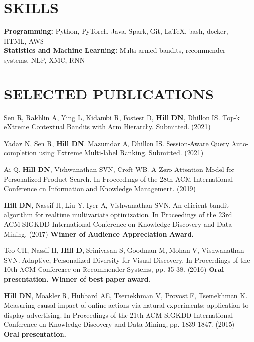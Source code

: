 \documentclass[line,10pt]{res}
\begin{document}
\begin{resume}
\section{SKILLS} 
{\bf Programming:} {\small Python, PyTorch, Java, Spark, Git, \LaTeX, bash, docker, HTML, AWS} \\
{\bf Statistics and Machine Learning: } {\small Multi-armed bandits, recommender systems, NLP, XMC, RNN}
    
\section{SELECTED PUBLICATIONS} 

Sen R, Rakhlin A, Ying L, Kidambi R, Fostesr D, \textbf{Hill DN}, Dhillon IS. Top-k eXtreme Contextual Bandits with Arm Hierarchy. Submitted. (2021)

Yadav N, Sen R, \textbf{Hill DN}, Mazumdar A, Dhillon IS. Session-Aware Query Auto-completion using Extreme Multi-label Ranking. Submitted. (2021)

Ai Q, \textbf{Hill DN}, Vishwanathan SVN, Croft WB. A Zero Attention Model for Personalized Product Search. In Proceedings of the 28th ACM International Conference on Information and Knowledge Management. (2019)

\textbf{Hill DN}, Nassif H, Liu Y, Iyer A, Vishwanathan SVN. An efficient bandit algorithm for realtime multivariate optimization. In Proceedings of the 23rd ACM SIGKDD International Conference on Knowledge Discovery and Data Mining. (2017) \textbf{Winner of Audience Appreciation Award.}

Teo CH, Nassif H, \textbf{Hill D}, Srinivasan S, Goodman M, Mohan V, Vishwanathan SVN. Adaptive, Personalized Diversity for Visual Discovery. In Proceedings of the 10th ACM Conference on Recommender Systems, pp. 35-38. (2016) \textbf{Oral presentation. Winner of best paper award.}

\textbf{Hill DN}, Moakler R, Hubbard AE, Tsemekhman V, Provost F, Tsemekhman K.  Measuring causal impact of online actions via natural experiments: application to display advertising. In Proceedings of the 21th ACM SIGKDD International Conference on Knowledge Discovery and Data Mining, pp. 1839-1847. (2015) \textbf{Oral presentation.}

\end{resume}
\end{document}
